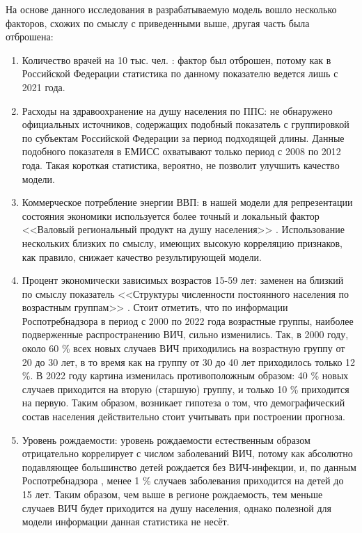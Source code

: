 \begin{table}[h]
{\begin{tabular}{ll}
\end{tabular}%
}
\end{table}

    На основе данного исследования в разрабатываемую модель вошло несколько факторов, схожих по смыслу с приведенными выше, другая часть была отброшена:

    \begin{enumerate}
    	\item Количество врачей на 10 тыс. чел. \cite{Vrachi_per_capita}: фактор был отброшен, потому как в Российской Федерации статистика по данному показателю ведется лишь с 2021 года. 
    	  
        \item Расходы на здравоохранение на душу населения по ППС: не обнаружено официальных источников, содержащих подобный показатель с группировкой по субъектам Российской Федерации за период подходящей длины. Данные подобного показателя в ЕМИСС охватывают только период с 2008 по 2012 года. Такая короткая статистика, вероятно, не позволит улучшить качество модели.
        
        \item Коммерческое потребление энергии ВВП: в нашей модели для репрезентации состояния экономики используется более точный и локальный фактор <<Валовый региональный продукт на душу населения>> \cite{vrp_per_capita}. Использование нескольких близких по смыслу, имеющих высокую корреляцию признаков, как правило, снижает качество результирующей модели.

        \item Процент экономически зависимых возрастов 15-59 лет: заменен на близкий по смыслу показатель <<Структуры численности постоянного населения по возрастным группам>> \cite{Chislennost_po_vozrastu}. Стоит отметить, что по информации Роспотребнадзора \cite{Справка_по_ВИЧ-инфекции_в_России_Роспотребнадзор_2022} в период с 2000 по 2022 года возрастные группы, наиболее подверженные распространению ВИЧ, сильно изменились. Так, в 2000 году, около 60 \% всех новых случаев ВИЧ приходились на возрастную группу от 20 до 30 лет, в то время как на группу от 30 до 40 лет приходилось только 12 \%. В 2022 году картина изменилась противоположным образом: 40 \% новых случаев приходится на вторую (старшую) группу, и только 10 \% приходится на первую. Таким образом, возникает гипотеза о том, что демографический состав населения действительно стоит учитывать при построении прогноза.

        \item Уровень рождаемости: уровень рождаемости естественным образом отрицательно коррелирует с числом заболеваний ВИЧ, потому как абсолютно подавляющее большинство детей рождается без ВИЧ-инфекции, и, по данным Роспотребнадзора \cite{Справка_по_ВИЧ-инфекции_в_России_Роспотребнадзор_2022}, менее 1 \% случаев заболевания приходится на детей до 15 лет. Таким образом, чем выше в регионе рождаемость, тем меньше случаев ВИЧ будет приходится на душу населения, однако полезной для модели информации данная статистика не несёт.


\end{enumerate}
